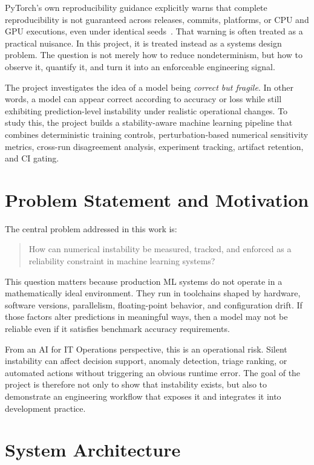 \documentclass[conference]{IEEEtran}
\begin{document}
PyTorch's own reproducibility guidance explicitly warns that complete reproducibility is not guaranteed across releases, commits, platforms, or CPU and GPU executions, even under identical seeds~\cite{pytorch_repro}. That warning is often treated as a practical nuisance. In this project, it is treated instead as a systems design problem. The question is not merely how to reduce nondeterminism, but how to observe it, quantify it, and turn it into an enforceable engineering signal.

The project investigates the idea of a model being \emph{correct but fragile}. In other words, a model can appear correct according to accuracy or loss while still exhibiting prediction-level instability under realistic operational changes. To study this, the project builds a stability-aware machine learning pipeline that combines deterministic training controls, perturbation-based numerical sensitivity metrics, cross-run disagreement analysis, experiment tracking, artifact retention, and CI gating.

\section{Problem Statement and Motivation}

The central problem addressed in this work is:

\begin{quote}
How can numerical instability be measured, tracked, and enforced as a reliability constraint in machine learning systems?
\end{quote}

This question matters because production ML systems do not operate in a mathematically ideal environment. They run in toolchains shaped by hardware, software versions, parallelism, floating-point behavior, and configuration drift. If those factors alter predictions in meaningful ways, then a model may not be reliable even if it satisfies benchmark accuracy requirements.

From an AI for IT Operations perspective, this is an operational risk. Silent instability can affect decision support, anomaly detection, triage ranking, or automated actions without triggering an obvious runtime error. The goal of the project is therefore not only to show that instability exists, but also to demonstrate an engineering workflow that exposes it and integrates it into development practice.

\section{System Architecture}
\end{document}
